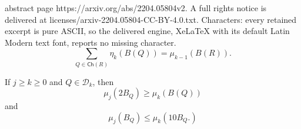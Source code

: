 \documentclass[10pt,a4paper]{amsart}
\newcommand{\Child}{\mathsf{Ch}}
\newcommand{\DD}{\mathcal{D}}
\begin{document}
abstract page https://arxiv.org/abs/2204.05804v2. A full rights notice is delivered at licenses/arxiv-2204.05804-CC-BY-4.0.txt. Characters: every retained excerpt is pure ASCII, so the delivered engine, XeLaTeX with its default Latin Modern text font, reports no missing character.
\begin{equation}\label{eq:etachildrencons}
\sum_{Q\in\Child(R)} \eta_{k}(B(Q)) = \mu_{k-1}(B(R)).
\end{equation}

\begin{lemma}\label{lem:massstays}
	If $j\ge k\ge 0$ and $Q\in\DD_k$, then
	\begin{equation}\label{eq:massstays}
	\mu_j(2B_Q)\ge \mu_k(B(Q))
	\end{equation}
	and
	\begin{equation}\label{eq:massstays2}
	\mu_j(B_Q)\le \mu_k(10B_Q.)
	\end{equation}
\end{lemma}
\end{document}
